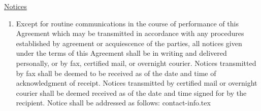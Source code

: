 \underline{Notices}
\begin{enumerate}
    \item Except for routine communications in the course of performance of
    this Agreement which may be transmitted in accordance with any
    procedures established by agreement or acquiescence of the parties, all
    notices given under the terms of this Agreement shall be in writing and
    delivered personally, or by fax, certified mail, or overnight courier.
    Notices transmitted by fax shall be deemed to be received as of the
    date and time of acknowledgment of receipt. Notices transmitted by
    certified mail or overnight courier shall be deemed received as of the
    date and time signed for by the recipient. Notice shall be addressed as
    follows:
    {contact-info.tex}
\end{enumerate}